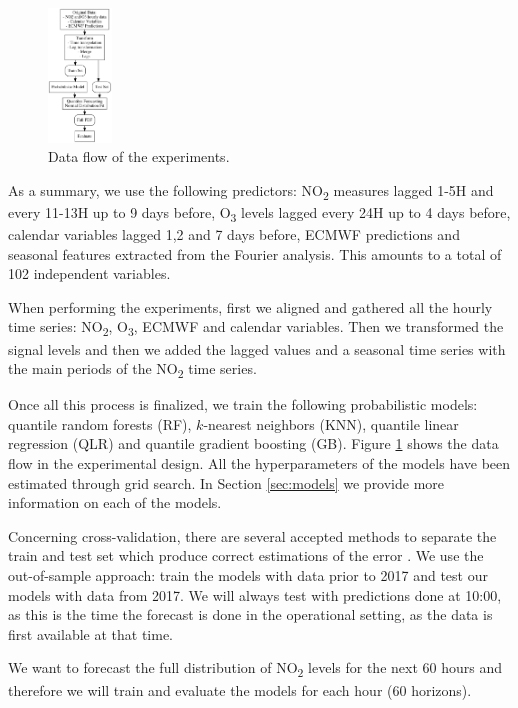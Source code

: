 \documentclass[a4paper,twocolumn,5p]{elsarticle}
\begin{document}
\begin{figure}
  \centering
  \includegraphics[width=0.15\textwidth]{diagrams/flow}
  \caption{\label{figure:dataflow}Data flow of the
    experiments.}
\end{figure}

As a summary, we use the following predictors: NO\textsubscript{2}
measures lagged 1-5H and every 11-13H up to 9 days before,
O\textsubscript{3} levels lagged every 24H up to 4 days before, 
calendar variables lagged 1,2 and 7 days before,
 ECMWF predictions and seasonal features extracted
from the Fourier analysis. This amounts to a total of 102 independent
variables. 

When performing the experiments, first we aligned and gathered all the
hourly time series: NO\textsubscript{2}, O\textsubscript{3}, ECMWF and
calendar variables.  Then we transformed the signal levels and then we
added the lagged values and a seasonal time series with the main
periods of the NO\textsubscript{2} time series.

Once all this process is finalized, we train the following
probabilistic models: quantile random forests (RF), $k$-nearest
neighbors (KNN), quantile linear regression (QLR) and quantile
gradient boosting (GB).  Figure \ref{figure:dataflow} shows the data
flow in the experimental design. All the hyperparameters of the models
have been estimated through grid search.  In Section \ref{sec:models}
we provide more information on each of the models.

Concerning cross-validation, there are several accepted methods to
separate the train and test set which produce correct estimations of
the error \cite{bergmeir_note_2018}. We use the out-of-sample
approach: train the models with data prior to 2017 and test our models
with data from 2017. We will always test with predictions done at
10:00, as this is the time the forecast is done in the operational
setting, as the data is first available at that time.

We want to forecast the full distribution of NO\textsubscript{2}
levels for the next 60 hours and therefore we will train and evaluate
the models for each hour (60 horizons).
\end{document}
